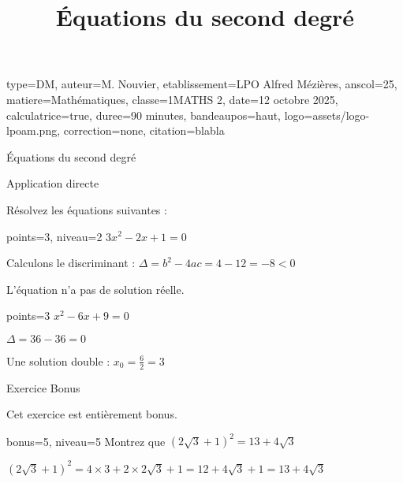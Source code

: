 \documentclass[theme=nb]{nfdevoirs}
\title{Équations du second degré}
\begin{document}
\begin{devoir}{
        type=DM,
        auteur={M. Nouvier},
        etablissement={LPO Alfred Mézières},
        anscol=25,
        matiere={Mathématiques},
        classe={1MATHS 2},
        date={12 octobre 2025},
        calculatrice=true,
        duree={90 minutes},
        bandeaupos=haut,
        logo={assets/logo-lpoam.png},
        correction=none,
        citation={blabla}
    }

    \begin{partie}{Équations du second degré}

        \begin{exercice}{Application directe}

            Résolvez les équations suivantes :

            \begin{question}{points=3, niveau=2}
                $3x^2 - 2x + 1 = 0$
            \end{question}

            \begin{correction}
                Calculons le discriminant : $\Delta = b^2 - 4ac = 4 - 12 = -8 < 0$

                L'équation n'a pas de solution réelle.
            \end{correction}

            \begin{question}{points=3}
                $x^2 - 6x + 9 = 0$
            \end{question}

            \begin{correction}
                $\Delta = 36 - 36 = 0$

                Une solution double : $x_0 = \frac{6}{2} = 3$
            \end{correction}

        \end{exercice}

        \begin{exercice}{Exercice Bonus}

            Cet exercice est entièrement bonus.

            \begin{question}{bonus=5, niveau=5}
                Montrez que $(2\sqrt{3} + 1)^2 = 13 + 4\sqrt{3}$
            \end{question}

            \begin{correction}
                $(2\sqrt{3} + 1)^2 = 4 \times 3 + 2 \times 2\sqrt{3} + 1 = 12 + 4\sqrt{3} + 1 = 13 + 4\sqrt{3}$
            \end{correction}

        \end{exercice}

    \end{partie}

\end{devoir}
\end{document}
